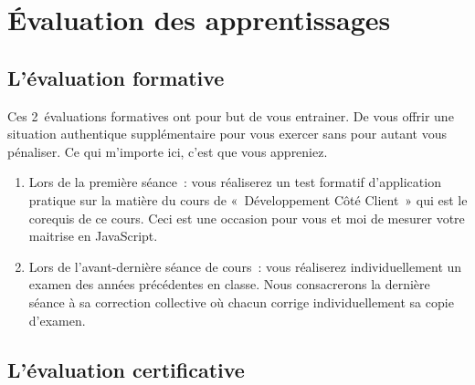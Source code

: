 \clearpage
\section{Évaluation des apprentissages}

\subsection{L’évaluation formative}
\label{eval_formative}

Ces 2~évaluations formatives ont pour but de vous entrainer. De vous offrir une situation authentique supplémentaire pour vous exercer sans pour autant vous pénaliser. Ce qui m'importe ici, c'est que vous appreniez.
\begin{enumerate}
    \item Lors de la première séance~: vous réaliserez un test formatif d’application pratique sur la matière du cours de «~Développement Côté Client~» qui est le corequis de ce cours. Ceci est une occasion pour vous et moi de mesurer votre maitrise en JavaScript.
    \item Lors de l'avant-dernière séance de cours~: vous réaliserez individuellement un examen des années précédentes en classe. Nous consacrerons la dernière séance à sa correction collective où chacun corrige individuellement sa copie d'examen.
\end{enumerate}

\subsection{L’évaluation certificative}
